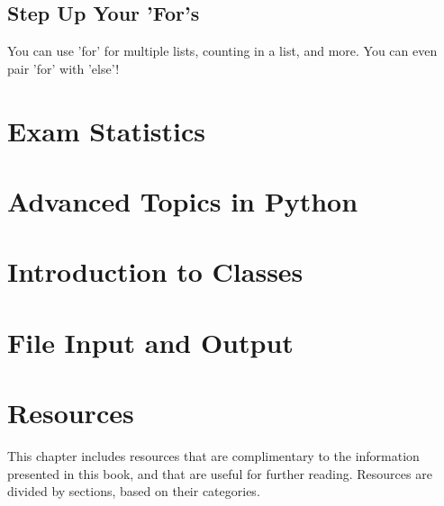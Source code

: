 \documentclass[12pt,a4paper,final,twoside,onecolumn,titlepage]{book}
\begin{document}
\section{Step Up Your 'For's}
You can use 'for' for multiple lists, counting in a list, and more. You can even pair 'for' with 'else'!

\chapter{Exam Statistics}

\chapter{Advanced Topics in Python}

\chapter{Introduction to Classes}

\chapter{File Input and Output}



\appendix
\renewcommand\chaptername{Appendix}
\chapter{Resources}
This chapter includes resources that are complimentary to the information presented in this book, and that are useful for further reading. Resources are divided by sections, based on their categories.
\end{document}
